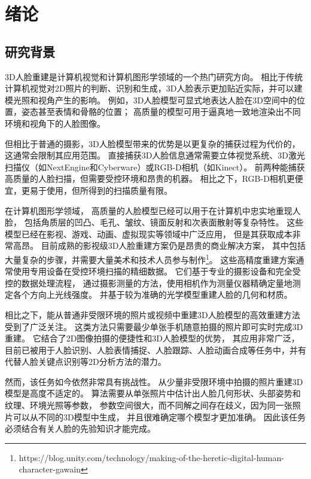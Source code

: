 \chapter{绪论}
\label{chap:intro}

\section{研究背景}

3D人脸重建是计算机视觉和计算机图形学领域的一个热门研究方向。
相比于传统计算机视觉对2D照片的判断、识别和生成，3D人脸表示更加贴近实际，并可以建模光照和视角产生的影响。
例如，3D人脸模型可显式地表达人脸在3D空间中的位置，姿态甚至表情和骨骼的位置；
高质量的模型可用于逼真地一致地渲染出不同环境和视角下的人脸图像。

但相比于普通的摄影，3D人脸模型带来的优势是以更复杂的捕获过程为代价的，这通常会限制其应用范围。
直接捕获3D人脸信息通常需要立体视觉系统\citep{DEP,ss_geo}、3D激光扫描仪（如NextEngine和Cyberware）或RGB-D相机\citep{li2023}（如Kinect）。
前两种能捕获高质量的人脸扫描，但需要受控环境和昂贵的机器。
相比之下，RGB-D相机更便宜，更易于使用，但所得到的扫描质量有限。

在计算机图形学领域，
高质量的人脸模型已经可以用于在计算机中忠实地重现人脸，
包括角质层的凹凸、毛孔、皱纹、镜面反射和次表面散射等复杂特性。
这些模型已经在影视、游戏、动画、虚拟现实等领域中广泛应用，
但是其获取成本非常高昂。
目前成熟的影视级3D人脸重建方案仍是昂贵的商业解决方案，
其中包括大量复杂的步骤，并需要大量美术和技术人员参与制作\footnote{https://blog.unity.com/technology/making-of-the-heretic-digital-human-character-gawain}。
这些高精度重建方案通常使用专用设备在受控环境扫描的精细数据。
它们基于专业的摄影设备和完全受控的数据处理流程，
通过摄影测量的方法，使用相机作为测量仪器精确定量地测定各个方向上光线强度。
并基于较为准确的光学模型重建人脸的几何和材质。

相比之下，能从普通非受限环境的照片或视频中重建3D人脸模型的高效重建方法受到了广泛关注。
这类方法只需要最少单张手机随意拍摄的照片即可实时完成3D重建。
它结合了2D图像拍摄的便捷性和3D人脸模型的优势，
其应用非常广泛，目前已被用于人脸识别\citep{BlanzV03,1022631413.nh,zhu2015high}、人脸表情捕捉\cite{Mo2022TowardsAF}、人脸跟踪\citep{Pham2016RobustRP}、人脸动画合成\citep{Cao20133DSR,thies2016face2face}等任务中，并有代替人脸关键点识别等2D分析方法的潜力。

然而，该任务如今依然非常具有挑战性。
从少量非受限环境中拍摄的照片重建3D模型是高度不适定的。
算法需要从单张照片中估计出人脸几何形状、头部姿势和纹理、环境光照等参数，
参数空间很大，而不同解之间存在歧义，因为同一张照片可以从不同的3D模型中生成，
并且很难确定哪个模型才更加准确。
因此该任务必须结合有关人脸的先验知识才能完成。

